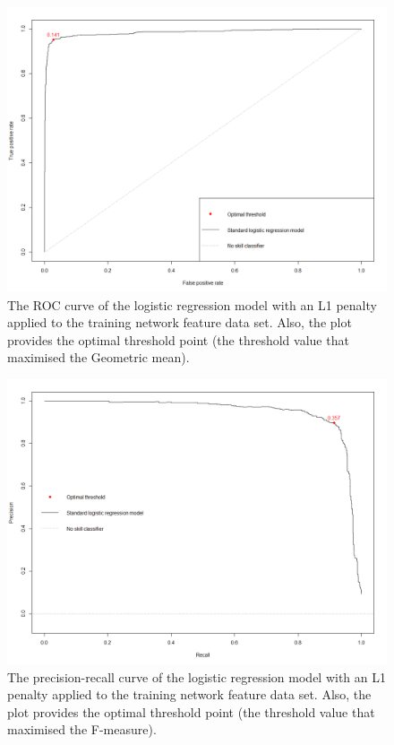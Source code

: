\begin{figure}
	\begin{center}
		\includegraphics[scale=0.45]{fig/CH3/lasso_log_ROC_threshold_network.png}
		\caption{The ROC curve of the logistic regression model with an L1 penalty applied to the training network feature data set. Also, the plot provides the optimal threshold point (the threshold value that maximised the Geometric mean).}
		\label{fig:ch3_lr_thresh_roc_lasso_network}
	\end{center}	
\end{figure}

\begin{figure}
	\begin{center}
		\includegraphics[scale=0.45]{fig/CH3/lasso_log_PR_threshold_network.png}
		\caption{The precision-recall curve of the logistic regression model with an L1 penalty applied to the training network feature data set. Also, the plot provides the optimal threshold point (the threshold value that maximised the F-measure).}
		\label{fig:ch3_lr_thresh_pr_lasso_network}
	\end{center}	
\end{figure}

